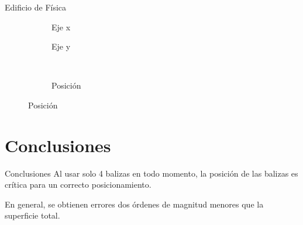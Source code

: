 \documentclass{beamer}
\begin{document}
  \begin{frame}{Edificio de Física}
    \begin{figure}[H]
      \centering
        \begin{subfigure}[b]{.3\textwidth}
          \centering
          \hspace*{-0.8cm}
           
          \caption{Eje x}
          \label{fig:boxplot_fisica_x}
        \end{subfigure}
        \hspace*{0.1cm}
        \begin{subfigure}[b]{.3\textwidth}
          \centering
            
          \caption{Eje y}
          \label{fig:boxplot_fisica_y}
        \end{subfigure}
        ~~~~
        \begin{subfigure}[b]{.3\textwidth}
            \centering
              
            \caption{Posición}
            \label{fig:boxplot_fisica_pos}
          \end{subfigure}
        \label{fig:boxplot_fisica}
    \end{figure}
  \end{frame}

\section{Conclusiones}
\begin{frame}{Conclusiones}
  Al usar solo 4 balizas en todo momento, la posición de las balizas es crítica para un correcto posicionamiento.

  En general, se obtienen errores dos órdenes de magnitud menores que la superficie total.
\end{frame}
\end{document}
